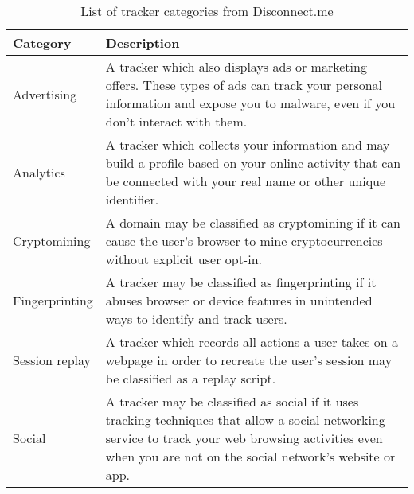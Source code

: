 \documentclass[main.tex]{subfiles}
\begin{document}

\begin{table}[H]
    \centering
    \begin{tabular}{|p{3cm}|p{11cm}|} \hline
        \textbf{Category} & \textbf{Description} \\ \hline
        Advertising & A tracker which also displays ads or marketing offers. These types of ads can track your personal information and expose you to malware, even if you don’t interact with them. \\ \hline
        Analytics & A tracker which collects your information and may build a profile based on your online activity that can be connected with your real name or other unique identifier. \\ \hline
        Cryptomining & A domain may be classified as cryptomining if it can cause the user's browser to mine cryptocurrencies without explicit user opt-in. \\ \hline
        Fingerprinting & A tracker may be classified as fingerprinting if it abuses browser or device features in unintended ways to identify and track users. \\ \hline
        Session replay & A tracker which records all actions a user takes on a webpage in order to recreate the user's session may be classified as a replay script. \\ \hline
        Social & A tracker may be classified as social if it uses tracking techniques that allow a social networking service to track your web browsing activities even when you are not on the social network’s website or app. \\ \hline
    \end{tabular}
    \caption{List of tracker categories from Disconnect.me}
    \label{tab:disconnectMe}
\end{table}
\end{document}
